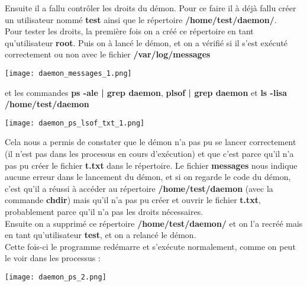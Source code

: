 Ensuite il a fallu contrôler les droits du démon. Pour ce faire il à déjà fallu créer un utilisateur nommé \textbf{test} ainsi que le répertoire \textbf{/home/test/daemon/}.\\

Pour tester les droits, la première fois on a créé ce répertoire en tant qu'utilisateur \textbf{root}. Puis on à lancé le démon, et on a vérifié si il s'est exécuté correctement ou non avec le fichier \textbf{/var/log/messages}

\begin{center} 
\hspace{15cm}
\texttt{[image: daemon\_messages\_1.png]}
\end{center}
\vspace{0.5cm}

et les commandes \textbf{ps -ale | grep daemon}, \textbf{plsof | grep daemon} et \textbf{ls -lisa /home/test/daemon}

\begin{center} 
\hspace{15cm}
\texttt{[image: daemon\_ps\_lsof\_txt\_1.png]}
\end{center}
\vspace{0.5cm}

Cela nous a permis de constater que le démon n'a pas pu se lancer correctement (il n'est pas dans les processus en cours d'exécution) et que c'est parce qu'il n'a pas pu créer le fichier \textbf{t.txt} dans le répertoire. Le fichier \textbf{messages} nous indique aucune erreur dans le lancement du démon, et si on regarde le code du démon, c'est qu'il a réussi à accéder au répertoire \textbf{/home/test/daemon} (avec la commande \textbf{chdir}) mais qu'il n'a pas pu créer et ouvrir le fichier \textbf{t.txt}, probablement parce qu'il n'a pas les droits nécessaires.\\

Ensuite on a supprimé ce répertoire \textbf{/home/test/daemon/} et on l'a recréé mais en tant qu'utilisateur \textbf{test}, et on a relancé le démon.\\

Cette fois-ci le programme redémarre et s'exécute normalement, comme on peut le voir dans les processus :

\begin{center} 
\hspace{15cm}
\texttt{[image: daemon\_ps\_2.png]}
\end{center}
\vspace{0.5cm}

